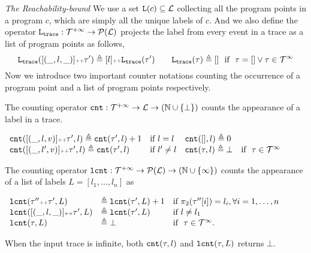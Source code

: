 \emph{The Reachability-bound}
We use a set $\mathtt{L}(c) \subseteq \mathcal{L}$ collecting all the program points in a program $c$, which are simply all the unique labels of $c$.
And we also define the operator $\mathtt{L}_{\mathtt{{trace}}}: \mathcal{T}^{+\infty} \to \mathcal{P}{(\mathcal{L})}$ projects the label from every event in a trace as a list of program points as follows,
{\small
\[
\mathtt{L}_{\mathtt{{trace}}}([(\_, l, \_)] {\scriptscriptstyle ++} \mathtt{\tau}') \triangleq [l] {\scriptscriptstyle ++} \mathtt{L}_{\mathtt{{trace}}}(\mathtt{\tau}')
\qquad
\mathtt{L}_{\mathtt{{trace}}}(\mathtt{\tau}) \triangleq []~~ \mbox{if}~~ \mathtt{\tau} = [] \lor \mathtt{\tau} \in \mathcal{T}^{\infty}
\]
}
Now we introduce two important counter notations counting the occurrence of a program point and a list of program points respectively.
\begin{defn}
 \label{def:counter}
The counting operator $\mathtt{cnt} : \mathcal{T}^{+\infty} \to \mathcal{L} \to (\mathbb{N} \cup \{\bot\})$
counts the appearance of a label in a trace.
\begin{center}
{\small
$
\begin{array}{llll}
\mathtt{cnt}([(\_, l, v)] {\scriptscriptstyle ++} \mathtt{\tau}', l ) \triangleq \mathtt{cnt}(\mathtt{\tau}', l) + 1 & \text{if}~ l = l
&
\mathtt{cnt}({[]}, l) \triangleq 0 & 
\\
\mathtt{cnt}([(\_, l', v)] {\scriptscriptstyle ++} \mathtt{\tau}', l) \triangleq \mathtt{cnt}(\mathtt{\tau}', l) & \text{if}~ l' \neq l
&
\mathtt{cnt}(\mathtt{\tau}, l) \triangleq \bot & \text{if }~ \mathtt{\tau} \in \mathcal{T}^{\infty}
\end{array}
$
}
\end{center}
\end{defn}
\begin{defn}
 \label{def:lcounter}
 The counting operator $\mathtt{lcnt} : \mathcal{T}^{+\infty} \to \mathcal{P}(\mathcal{L}) \to (\mathbb{N} \cup \{\infty\})$
 counts the appearance of a list of labels $L = [l_1, \ldots, l_n]$ as
{\small
\begin{center}
 $
 \begin{array}{lll}
 \mathtt{lcnt}(\mathtt{\tau}'' {\scriptscriptstyle ++} \mathtt{\tau}', L ) 
 & \triangleq \mathtt{lcnt}(\mathtt{\tau}', L) + 1 & \text{if}~ \pi_2(\mathtt{\tau}''[i]) = l_i, \forall i = 1, \ldots, n
 \\ 
 \mathtt{lcnt}([(\_, l, \_)] {\scriptscriptstyle ++} \mathtt{\tau}', L ) 
 & \triangleq \mathtt{lcnt}(\mathtt{\tau}', L) & \text{if}~ l \neq l_1
 \\ 
 \mathtt{lcnt}(\mathtt{\tau}, L ) 
 & \triangleq \bot & \text{if }~ \mathtt{\tau} \in \mathcal{T}^{\infty}.
 \end{array}
 $
 \end{center}
 }
\end{defn}
%
When the input trace is infinite, both $\mathtt{cnt}(\mathtt{\tau}, l)$ and $\mathtt{lcnt}(\mathtt{\tau}, L)$ returns $\bot$.

